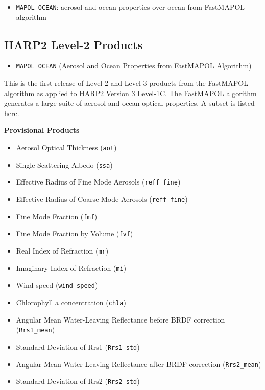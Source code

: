 \documentclass[
  11pt,
  letterpaper,
]{scrreprt}
\providecommand{\tightlist}{%
  \setlength{\itemsep}{0pt}\setlength{\parskip}{0pt}}
\begin{document}
\begin{itemize}
\tightlist
\item
  \texttt{MAPOL\_OCEAN}: aerosol and ocean properties over ocean from
  FastMAPOL algorithm
\end{itemize}

\subsection*{HARP2 Level-2 Products}\label{harp2-level-2-products-1}

\begin{itemize}
\tightlist
\item
  \texttt{MAPOL\_OCEAN} (Aerosol and Ocean Properties from FastMAPOL
  Algorithm)
\end{itemize}

This is the first release of Level-2 and Level-3 products from the
FastMAPOL algorithm as applied to HARP2 Version 3 Level-1C. The
FastMAPOL algorithm generates a large suite of aerosol and ocean optical
properties. A subset is listed here.

\textbf{Provisional Products}

\begin{itemize}
\tightlist
\item
  Aerosol Optical Thickness (\texttt{aot})
\item
  Single Scattering Albedo (\texttt{ssa})
\item
  Effective Radius of Fine Mode Aerosols (\texttt{reff\_fine})
\item
  Effective Radius of Coarse Mode Aerosols (\texttt{reff\_fine})
\item
  Fine Mode Fraction (\texttt{fmf})
\item
  Fine Mode Fraction by Volume (\texttt{fvf})
\item
  Real Index of Refraction (\texttt{mr})
\item
  Imaginary Index of Refraction (\texttt{mi})
\item
  Wind speed (\texttt{wind\_speed})
\item
  Chlorophyll a concentration (\texttt{chla})
\item
  Angular Mean Water-Leaving Reflectance before BRDF correction
  (\texttt{Rrs1\_mean})
\item
  Standard Deviation of Rrs1 (\texttt{Rrs1\_std})
\item
  Angular Mean Water-Leaving Reflectance after BRDF correction
  (\texttt{Rrs2\_mean})
\item
  Standard Deviation of Rrs2 (\texttt{Rrs2\_std})
\end{itemize}
\end{document}
